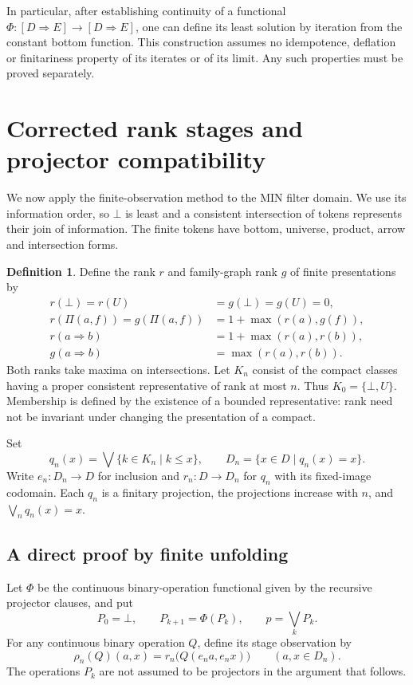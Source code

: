 \documentclass[11pt,a4paper]{article}
\theoremstyle{definition}
\newtheorem{definition}[theorem]{Definition}
\theoremstyle{remark}
\newcommand{\Cont}[2]{[#1\mathbin{\Rightarrow}#2]}
\newcommand{\lub}{\bigvee}
\begin{document}
In particular, after establishing continuity of a functional
$\Phi:\Cont D E\to\Cont D E$, one can define its least solution by
iteration from the constant bottom function. This construction assumes
no idempotence, deflation or finitariness property of its iterates or of
its limit. Any such properties must be proved separately.

\section{Corrected rank stages and projector compatibility}

We now apply the finite-observation method to the MIN filter domain.
We use its information order, so $\bot$ is least and a consistent
intersection of tokens represents their join of information. The finite
tokens have bottom, universe, product, arrow and intersection forms.
\begin{definition}
Define the rank $r$ and family-graph rank $g$ of finite presentations by
\[
\begin{aligned}
 r(\bot)=r(U)&=g(\bot)=g(U)=0,\\
 r(\Pi(a,f))=g(\Pi(a,f))&=1+\max(r(a),g(f)),\\
 r(a\Rightarrow b)&=1+\max(r(a),r(b)),\\
 g(a\Rightarrow b)&=\max(r(a),r(b)).
\end{aligned}
\]
Both ranks take maxima on intersections. Let $K_n$ consist of the
compact classes having a proper consistent representative of rank at
most $n$. Thus $K_0=\{\bot,U\}$. Membership is defined by the existence
of a bounded representative: rank need not be invariant under changing
the presentation of a compact.

Set
\[
 q_n(x)=\lub\{k\in K_n\mid k\leq x\},\qquad
 D_n=\{x\in D\mid q_n(x)=x\}.
\]
Write $e_n:D_n\to D$ for inclusion and $r_n:D\to D_n$ for $q_n$ with
its fixed-image codomain. Each $q_n$ is a finitary projection, the
projections increase with $n$, and $\lub_n q_n(x)=x$.
\end{definition}

\subsection{A direct proof by finite unfolding}

Let $\Phi$ be the continuous binary-operation functional given by the
recursive projector clauses, and put
\[
 P_0=\bot,\qquad P_{k+1}=\Phi(P_k),\qquad p=\bigvee_k P_k.
\]
For any continuous binary operation $Q$, define its stage observation by
\[
 \rho_n(Q)(a,x)=r_n\bigl(Q(e_n a,e_n x)\bigr)
 \qquad(a,x\in D_n).
\]
The operations $P_k$ are not assumed to be projectors in the argument
that follows.
\end{document}
